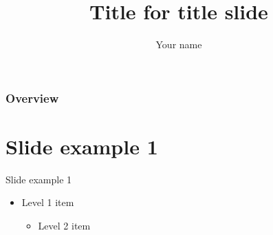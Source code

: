 \documentclass{beamer}
\title[Title for other slides]{Title for title slide} %
\author{Your name}
\institute[Institution for other slides]
{
    Institution for title slide \\
    \medskip
}
\date{}
\begin{document}
\begin{frame}
    \titlepage %
\end{frame}

\begin{frame}
    \frametitle{Overview} %
    \tableofcontents %
\end{frame}







\section{Slide example 1}
\begin{frame}{Slide example 1}
    \begin{itemize}
        \item Level 1 item
        \begin{itemize}
            \item Level 2 item
        \end{itemize}
    \end{itemize}
\end{frame}
\end{document}
